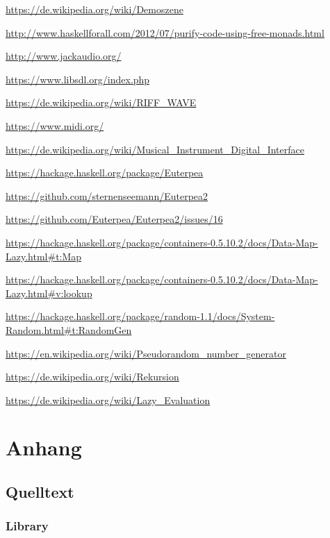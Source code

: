 \documentclass[a4paper,twocolumn]{article}
\begin{document}
\begin{thebibliography}{9}
  \url{https://de.wikipedia.org/wiki/Demoszene}

  \url{http://www.haskellforall.com/2012/07/purify-code-using-free-monads.html}

  \url{http://www.jackaudio.org/}

  \url{https://www.libsdl.org/index.php}

  \url{https://de.wikipedia.org/wiki/RIFF_WAVE}

  \url{https://www.midi.org/}

  \url{https://de.wikipedia.org/wiki/Musical_Instrument_Digital_Interface}

  \url{https://hackage.haskell.org/package/Euterpea}

  \url{https://github.com/sternenseemann/Euterpea2}

  \url{https://github.com/Euterpea/Euterpea2/issues/16}

  \url{https://hackage.haskell.org/package/containers-0.5.10.2/docs/Data-Map-Lazy.html#t:Map}

  \url{https://hackage.haskell.org/package/containers-0.5.10.2/docs/Data-Map-Lazy.html#v:lookup}

  \url{https://hackage.haskell.org/package/random-1.1/docs/System-Random.html#t:RandomGen}

  \url{https://en.wikipedia.org/wiki/Pseudorandom_number_generator}

  \url{https://de.wikipedia.org/wiki/Rekursion}

  \url{https://de.wikipedia.org/wiki/Lazy_Evaluation}
\end{thebibliography}

\clearpage
\onecolumn

\section*{Anhang}
\subsection*{Quelltext}
\subsubsection*{Library}
\label{sec:library}

\clearpage
\end{document}
